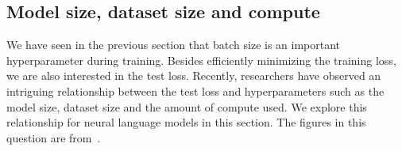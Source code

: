 \subsection{Model size, dataset size and compute}\label{sec:size_compute}
We have seen in the previous section that batch size is an important hyperparameter during training. Besides efficiently minimizing the training loss, we are also interested in the test loss. Recently, researchers have observed an intriguing relationship between the test loss and hyperparameters such as the model size, dataset size and the amount of compute used. We explore this relationship for neural language models in this section. The figures in this question are from~\cite{kaplan2020scaling}.
